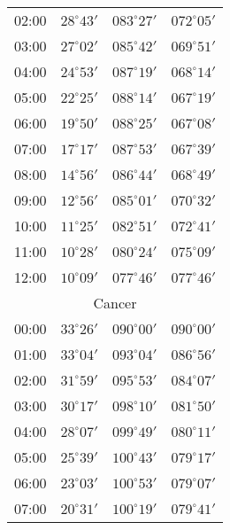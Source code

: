 \begin{table}
\begin{Parallel}{}{}
{{\begin{tabular}{l|lll}
02:00 & $28^\circ 43'$ & $083^\circ 27'$& $072^\circ 05'$ \\
03:00 & $27^\circ 02'$ & $085^\circ 42'$& $069^\circ 51'$ \\
04:00 & $24^\circ 53'$ & $087^\circ 19'$& $068^\circ 14'$ \\
05:00 & $22^\circ 25'$ & $088^\circ 14'$& $067^\circ 19'$ \\
06:00 & $19^\circ 50'$ & $088^\circ 25'$& $067^\circ 08'$ \\
07:00 & $17^\circ 17'$ & $087^\circ 53'$& $067^\circ 39'$ \\
08:00 & $14^\circ 56'$ & $086^\circ 44'$& $068^\circ 49'$ \\
09:00 & $12^\circ 56'$ & $085^\circ 01'$& $070^\circ 32'$ \\
10:00 & $11^\circ 25'$ & $082^\circ 51'$& $072^\circ 41'$ \\
11:00 & $10^\circ 28'$ & $080^\circ 24'$& $075^\circ 09'$ \\
12:00 & $10^\circ 09'$ & $077^\circ 46'$& $077^\circ 46'$ \\
\multicolumn{4}{c}{Cancer}\\
00:00 & $33^\circ 26'$ & $090^\circ 00'$& $090^\circ 00'$ \\
01:00 & $33^\circ 04'$ & $093^\circ 04'$& $086^\circ 56'$ \\
02:00 & $31^\circ 59'$ & $095^\circ 53'$& $084^\circ 07'$ \\
03:00 & $30^\circ 17'$ & $098^\circ 10'$& $081^\circ 50'$ \\
04:00 & $28^\circ 07'$ & $099^\circ 49'$& $080^\circ 11'$ \\
05:00 & $25^\circ 39'$ & $100^\circ 43'$& $079^\circ 17'$ \\
06:00 & $23^\circ 03'$ & $100^\circ 53'$& $079^\circ 07'$ \\
07:00 & $20^\circ 31'$ & $100^\circ 19'$& $079^\circ 41'$ \\
\end{tabular}
}}
\end{Parallel}
\end{table}
